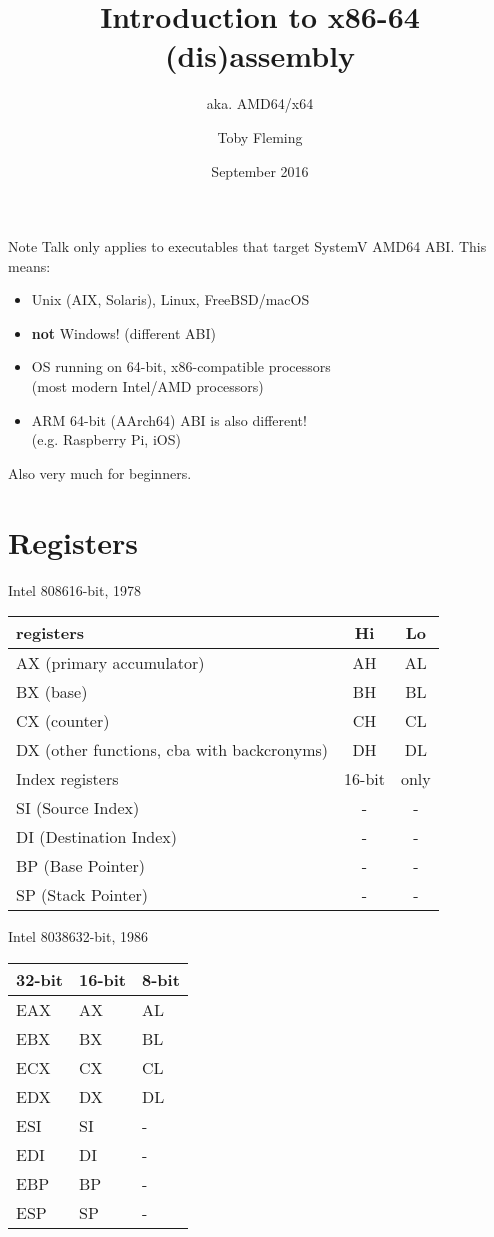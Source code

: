 \documentclass[table,xetex,12pt,aspectratio=169]{beamer}
\title{Introduction to x86-64 (dis)assembly}
\subtitle{aka. AMD64/x64}
\author{Toby Fleming}
\date{September 2016}
\begin{document}
\maketitle

\begin{frame}{Note}
Talk only applies to executables that target SystemV AMD64 ABI. This means:
\vfill
\begin{itemize}
\item Unix (AIX, Solaris), Linux, FreeBSD/macOS
\item \textbf{not} Windows! (different ABI)
\item OS running on 64-bit, x86-compatible processors\\(most modern Intel/AMD processors)
\item ARM 64-bit (AArch64) ABI is also different!\\(e.g. Raspberry Pi, iOS)
\end{itemize}
\vfill
Also very much for beginners.
\end{frame}

\section{Registers}

\begin{frame}{Intel 8086}{16-bit, 1978}
\begin{tabularx}{\textwidth}{X<{\onslide<2->}|cc<{\onslide}}
 registers & Hi & Lo \\
\hline
AX (primary accumulator) & AH & AL \\
BX (base) & BH & BL \\
CX (counter) & CH & CL \\
DX (other functions, cba with backcronyms) & DH & DL \\
\hline
Index registers & 16-bit & only \\
\hline
SI (Source Index) & - & - \\
DI (Destination Index) & - & - \\
BP (Base Pointer) & - & - \\
SP (Stack Pointer) & - & - \\
\end{tabularx}
\vfill
{}
\end{frame}

\begin{frame}{Intel 80386}{32-bit, 1986}
\begin{tabularx}{\textwidth}{XXX}
32-bit & 16-bit & 8-bit \\
\hline
EAX & AX & AL \\
EBX & BX & BL \\
ECX & CX & CL \\
EDX & DX & DL \\
\hline
ESI & SI & - \\
EDI & DI & - \\
EBP & BP & - \\
ESP & SP & - \\
\end{tabularx}
\end{frame}
\end{document}
